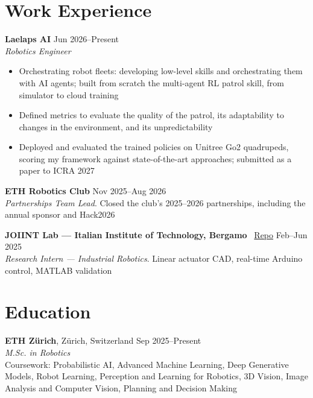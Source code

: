 \documentclass[a4paper,10pt]{article}
\begin{document}
\cvheader

\section*{Work Experience}
\textbf{Laelaps AI} \hfill Jun 2026--Present\\
\textit{Robotics Engineer}
\vspace{-5pt}
\begin{itemize}
    \item Orchestrating robot fleets: developing low-level skills and orchestrating them with AI agents; built from scratch the multi-agent RL patrol skill, from simulator to cloud training
    \item Defined metrics to evaluate the quality of the patrol, its adaptability to changes in the environment, and its unpredictability
    \item Deployed and evaluated the trained policies on Unitree Go2 quadrupeds, scoring my framework against state-of-the-art approaches; submitted as a paper to ICRA 2027
\end{itemize}

\textbf{ETH Robotics Club} \hfill Nov 2025--Aug 2026\\
\textit{Partnerships Team Lead}. Closed the club's 2025--2026 partnerships, including the annual sponsor and Hack2026

\textbf{JOIINT Lab — Italian Institute of Technology, Bergamo} \faGithub\ \href{https://github.com/alessiosalvatore1703-ops/Linear-Actuator}{Repo} \hfill Feb--Jun 2025\\
\textit{Research Intern — Industrial Robotics}. Linear actuator CAD, real-time Arduino control, MATLAB validation
\vspace{4pt}

\section*{Education}

\textbf{ETH Zürich}, Zürich, Switzerland \hfill Sep 2025--Present\\
\textit{M.Sc. in Robotics} \\
Coursework: Probabilistic AI, Advanced Machine Learning, Deep Generative Models, Robot Learning, Perception and Learning for Robotics, 3D Vision, Image Analysis and Computer Vision, Planning and Decision Making
\end{document}
